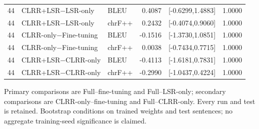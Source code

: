 \documentclass[11pt]{article}
\begin{document}
\begin{table}[!ht]
{\begin{tabular}{rllrrr}
44 & CLRR+LSR$-$LSR-only & BLEU & 0.4087 & [-0.6299,1.4883] & 1.0000 \\
44 & CLRR+LSR$-$LSR-only & chrF++ & 0.2432 & [-0.4074,0.9060] & 1.0000 \\
44 & CLRR-only$-$Fine-tuning & BLEU & -0.1516 & [-1.3730,1.0851] & 1.0000 \\
44 & CLRR-only$-$Fine-tuning & chrF++ & 0.0038 & [-0.7434,0.7715] & 1.0000 \\
44 & CLRR+LSR$-$CLRR-only & BLEU & -0.4113 & [-1.6181,0.7831] & 1.0000 \\
44 & CLRR+LSR$-$CLRR-only & chrF++ & -0.2990 & [-1.0437,0.4224] & 1.0000 \\
\bottomrule
\end{tabular}%
}
\end{table}
Primary comparisons are Full--fine-tuning and Full--LSR-only; secondary comparisons are CLRR-only--fine-tuning and Full--CLRR-only. Every run and test is retained. Bootstrap conditions on trained weights and test sentences; no aggregate training-seed significance is claimed.
\end{document}
